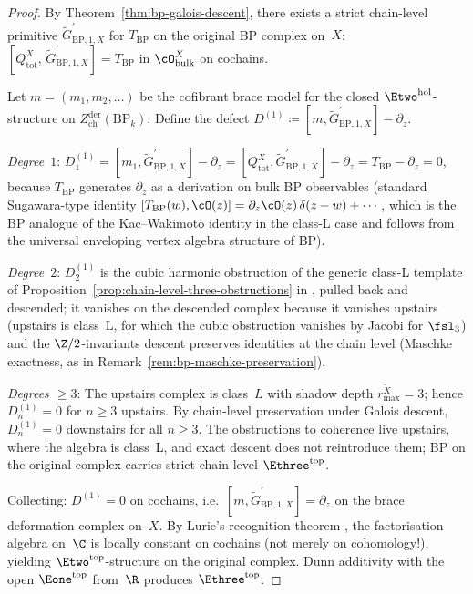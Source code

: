 \begin{proof}
By Theorem~\ref{thm:bp-galois-descent}, there exists a strict
chain-level primitive
$\widetilde G^{\prime}_{\mathrm{BP}, 1, X}$ for $T_{\mathrm{BP}}$
on the original BP complex on~$X$:
$[Q_{\mathrm{tot}}^{X},\, \widetilde G^{\prime}_{\mathrm{BP}, 1, X}] = T_{\mathrm{BP}}$
in $\cO_{\mathrm{bulk}}^{X}$ on cochains.

Let $m = (m_1, m_2, \ldots)$ be the cofibrant brace model for the
closed $\Etwo^{\mathrm{hol}}$-structure on
$Z^{\mathrm{der}}_{\mathrm{ch}}(\mathrm{BP}_k)$. Define the defect
$D^{(1)} \coloneqq [m, \widetilde G^{\prime}_{\mathrm{BP}, 1, X}]
 - \partial_z$.

\emph{Degree~$1$}: $D^{(1)}_1 = [m_1, \widetilde G^{\prime}_{\mathrm{BP}, 1, X}] - \partial_z
 = [Q_{\mathrm{tot}}^{X}, \widetilde G^{\prime}_{\mathrm{BP}, 1, X}] - \partial_z
 = T_{\mathrm{BP}} - \partial_z = 0$,
because $T_{\mathrm{BP}}$ generates $\partial_z$ as a derivation
on bulk BP observables (standard Sugawara-type identity
$[T_{\mathrm{BP}}(w), \cO(z)] = \partial_z \cO(z)\,\delta(z-w) + \cdots$,
which is the BP analogue of the Kac--Wakimoto identity in the
class-L case and follows from the universal enveloping vertex
algebra structure of BP).

\emph{Degree~$2$}: $D^{(1)}_2$ is the cubic harmonic obstruction
of the generic class-L template of
Proposition~\ref{prop:chain-level-three-obstructions} in
\cite[\S\ref*{V1-sec:strict-chain-level}]{Vol1-class-L-antighost},
pulled back and descended; it vanishes on the descended complex
because it vanishes upstairs (upstairs is class~L, for which the
cubic obstruction vanishes by Jacobi for $\fsl_3$) and the
$\Z/2$-invariants descent preserves identities at the chain level
(Maschke exactness, as in
Remark~\ref{rem:bp-maschke-preservation}).

\emph{Degrees $\ge 3$}: The upstairs complex is class~$L$ with
shadow depth $r_{\max}^{\widetilde X} = 3$; hence $D^{(1)}_n = 0$
for $n \ge 3$ upstairs. By chain-level preservation under Galois
descent, $D^{(1)}_n = 0$ downstairs for all $n \ge 3$. The
obstructions to coherence live upstairs, where the algebra is
class~L, and exact descent does not reintroduce them; BP on the
original complex carries strict chain-level
$\Ethree^{\mathrm{top}}$.

Collecting: $D^{(1)} = 0$ on cochains, i.e.\
$[m, \widetilde G^{\prime}_{\mathrm{BP}, 1, X}] = \partial_z$ on
the brace deformation complex on~$X$. By Lurie's recognition
theorem \cite[Thm 5.4.5.9]{HA}, the factorisation algebra on~$\C$
is locally constant on cochains (not merely on cohomology!),
yielding $\Etwo^{\mathrm{top}}$-structure on the original complex.
Dunn additivity \cite[Thm 5.1.2.2]{HA} with the open
$\Eone^{\mathrm{top}}$ from~$\R$ produces
$\Ethree^{\mathrm{top}}$.
\end{proof}

